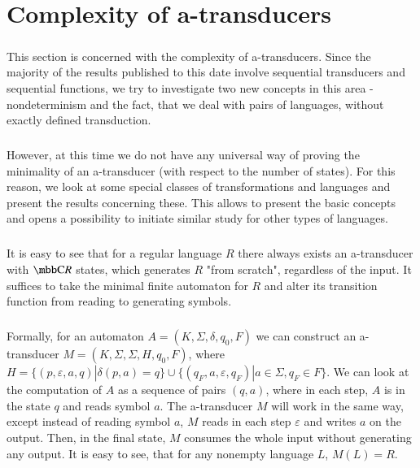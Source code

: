 \chapter{Complexity of a-transducers}
\label{chap:complexity}

\paragraph{}
This section is concerned with the complexity of a-transducers. Since the majority of the results published to this date involve sequential transducers and sequential functions, we try to investigate two new concepts in this area - nondeterminism and the fact, that we deal with pairs of languages, without exactly defined transduction.

\paragraph{}
However, at this time we do not have any universal way of proving the minimality of an a-transducer (with respect to the number of states). For this reason, we look at some special classes of transformations and languages and present the results concerning these. This allows to present the basic concepts and opens a possibility to initiate similar study for other types of languages.

\paragraph{}
It is easy to see that for a regular language $R$ there always exists an a-transducer with $\C{R}$ states, which generates $R$ "from scratch", regardless of the input. It suffices to take the minimal finite automaton for $R$ and alter its transition function from reading to generating symbols.

\paragraph{}
Formally, for an automaton $A = (K, \Sigma, \delta, q_0, F)$ we can construct an a-transducer $M = (K, \Sigma, \Sigma, H, q_0, F)$, where $H = \{ (p, \varepsilon, a, q) | \delta (p, a) = q\} \cup \{ (q_F, a, \varepsilon, q_F) | a \in \Sigma, q_F \in F \} $. We can look at the computation of $A$ as a sequence of pairs $(q, a)$, where in each step, $A$ is in the state $q$ and reads symbol $a$. The a-transducer $M$ will work in the same way, except instead of reading symbol $a$, $M$ reads in each step $\varepsilon$ and writes $a$ on the output. Then, in the final state, $M$ consumes the whole input without generating any output. It is easy to see, that for any nonempty language $L$, $M(L) = R$.


